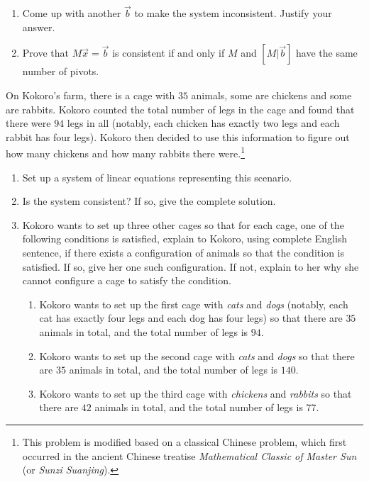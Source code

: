 \begin{exercises}
\begin{problist}
\begin{enumerate}
			\item Come up with another $\vec b$ to make the system inconsistent.
				Justify your answer.

			\item Prove that $M\vec x=\vec b$ is consistent if and only if $M$ and
				$[M|\vec b]$ have the same number of pivots.
		\end{enumerate}

		\prob On Kokoro's farm, there is a cage with $35$ animals, some are chickens
		and some are rabbits. Kokoro counted the total number of legs in the
		cage and found that there were $94$ legs in all (notably, each chicken
		has exactly two legs and each rabbit has four legs). Kokoro then decided
		to use this information to figure out how many chickens and how many
		rabbits there were.\footnote{This problem is modified based on a
		classical Chinese problem, which first occurred in the ancient Chinese treatise
		\emph{Mathematical Classic of Master Sun} (or \emph{Sunzi Suanjing}).}

		\begin{enumerate}
			\item Set up a system of linear equations representing this scenario.

			\item Is the system consistent? If so, give the complete solution.

			\item Kokoro wants to set up three other cages so that for each cage,
				one of the following conditions is satisfied, explain to Kokoro,
				using complete English sentence, if there exists a configuration
				of animals so that the condition is satisfied. If so, give her one
				such configuration. If not, explain to her why she cannot configure
				a cage to satisfy the condition.
				\begin{enumerate}
					\item Kokoro wants to set up the first cage with \emph{cats}
						and \emph{dogs} (notably, each cat has exactly four legs
						and each dog has four legs) so that there are $35$
						animals in total, and the total number of legs is $94$.

					\item Kokoro wants to set up the second cage with \emph{cats}
						and \emph{dogs} so that there are $35$ animals in total,
						and the total number of legs is $140$.

					\item Kokoro wants to set up the third cage with \emph{chickens}
						and \emph{rabbits} so that there are $42$ animals in total,
						and the total number of legs is $77$.
				\end{enumerate}
		\end{enumerate}
	\end{problist}
\end{exercises}